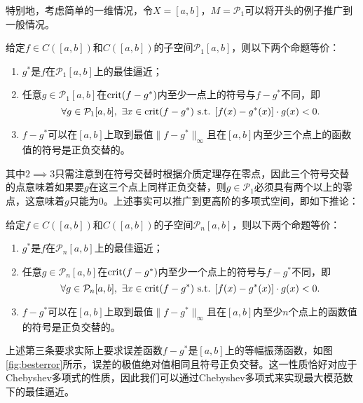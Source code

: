 \documentclass[a4paper,10pt]{ctexart}
\begin{document}
特别地，考虑简单的一维情况，令$ X = [a,b] $，$ M=\mathcal{P}_1 $可以将开头的例子推广到一般情况。
\begin{corollary}
    给定$ f\in C([a,b]) $和$ C([a,b]) $的子空间$ \mathcal{P}_1[a,b] $，则以下两个命题等价：
    \begin{enumerate}
        \item $ g^* $是$ f $在$ \mathcal{P}_1[a,b] $上的最佳逼近；
        \item 任意$ g\in \mathcal{P}_1[a,b] $在$ {\rm crit}(f-g^*) $内至少一点上的符号与$ f-g^* $不同，即
        \begin{equation}
            \forall g\in \mathcal{P}_1[a,b],\ \exists x\in {\rm crit}(f-g^*) \text{ s.t. }[f(x)-g^*(x)]\cdot g(x)<0.
        \end{equation}
        \item $ f-g^* $可以在$ [a,b] $上取到最值$ \| f-g^* \|_\infty $且在$ [a,b] $内至少三个点上的函数值的符号是正负交替的。
    \end{enumerate}
\end{corollary}
其中$ 2 \implies 3 $只需注意到在符号交替时根据介质定理存在零点，因此三个符号交替的点意味着如果要$ g $在这三个点上同样正负交替，则$ g\in \mathcal{P}_1 $必须具有两个以上的零点，这意味着$ g $只能为$ 0 $。上述事实可以推广到更高阶的多项式空间，即如下推论：
\begin{corollary}
    给定$ f\in C([a,b]) $和$ C([a,b]) $的子空间$ \mathcal{P}_n[a,b] $，则以下两个命题等价：
    \begin{enumerate}
        \item $ g^* $是$ f $在$ \mathcal{P}_n[a,b] $上的最佳逼近；
        \item 任意$ g\in \mathcal{P}_n[a,b] $在$ {\rm crit}(f-g^*) $内至少一个点上的符号与$ f-g^* $不同，即
        \begin{equation}
            \forall g\in \mathcal{P}_n[a,b],\ \exists x\in {\rm crit}(f-g^*) \text{ s.t. }[f(x)-g^*(x)]\cdot g(x)<0.
        \end{equation}
        \item $ f-g^* $可以在$ [a,b] $上取到最值$ \| f-g^* \|_\infty $且在$ [a,b] $内至少$ n $个点上的函数值的符号是正负交替的。
    \end{enumerate}
\end{corollary}
上述第三条要求实际上要求误差函数$ f-g^* $是$ [a,b] $上的等幅振荡函数，如图\ref{fig:besterror}所示，误差的极值绝对值相同且符号正负交替。这一性质恰好对应于Chebyshev多项式的性质，因此我们可以通过Chebyshev多项式来实现最大模范数下的最佳逼近。
\end{document}
